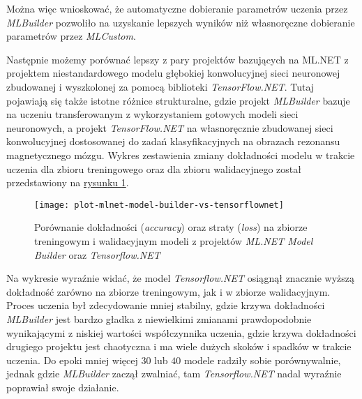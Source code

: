 Można więc wnioskować, że automatyczne dobieranie parametrów uczenia przez \emph{MLBuilder} pozwoliło na uzyskanie lepszych wyników niż własnoręczne dobieranie parametrów przez \emph{MLCustom}.

Następnie możemy porównać lepszy z pary projektów bazujących na ML.NET z projektem niestandardowego modelu głębokiej konwolucyjnej sieci neuronowej zbudowanej i wyszkolonej za pomocą biblioteki \emph{TensorFlow.NET}.
Tutaj pojawiają się także istotne różnice strukturalne, gdzie projekt \emph{MLBuilder} bazuje na uczeniu transferowanym z wykorzystaniem gotowych modeli sieci neuronowych, a projekt \emph{TensorFlow.NET} na własnoręcznie zbudowanej sieci konwolucyjnej dostosowanej do zadań klasyfikacyjnych na obrazach rezonansu magnetycznego mózgu.
Wykres zestawienia zmiany dokładności modelu w trakcie uczenia dla zbioru treningowego oraz dla zbioru walidacyjnego został przedstawiony na \hyperref[fig:plot-mlnet-model-builder-vs-tensorflownet]{rysunku \ref*{fig:plot-mlnet-model-builder-vs-tensorflownet}}.

\begin{figure}[ht]
  \texttt{[image: plot-mlnet-model-builder-vs-tensorflownet]}
  \caption[Porównanie dokładności oraz straty modeli ML.NET Model Builder oraz Tensorflow.NET]{Porównanie dokładności (\emph{accuracy}) oraz straty (\emph{loss}) na zbiorze treningowym i walidacyjnym modeli z projektów \emph{ML.NET Model Builder} oraz \emph{Tensorflow.NET}}
  \label{fig:plot-mlnet-model-builder-vs-tensorflownet}
\end{figure}

Na wykresie wyraźnie widać, że model \emph{Tensorflow.NET} osiągnął znacznie wyższą dokładność zarówno na zbiorze treningowym, jak i w zbiorze walidacyjnym.
Proces uczenia był zdecydowanie mniej stabilny, gdzie krzywa dokładności \emph{MLBuilder} jest bardzo gładka z niewielkimi zmianami prawdopodobnie wynikającymi z niskiej wartości współczynnika uczenia, gdzie krzywa dokładności drugiego projektu jest chaotyczna i ma wiele dużych skoków i spadków w trakcie uczenia.
Do epoki mniej więcej $30$ lub $40$ modele radziły sobie porównywalnie, jednak gdzie \emph{MLBuilder} zaczął zwalniać, tam \emph{Tensorflow.NET} nadal wyraźnie poprawiał swoje działanie.


